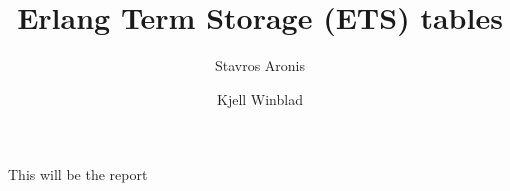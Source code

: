 \documentclass[pdftex,a4paper]{article}
\title{Erlang Term Storage (ETS) tables}
\author{Stavros Aronis \and Kjell Winblad}
\date{}
\begin{document}
\maketitle

This will be the report
\end{document}

